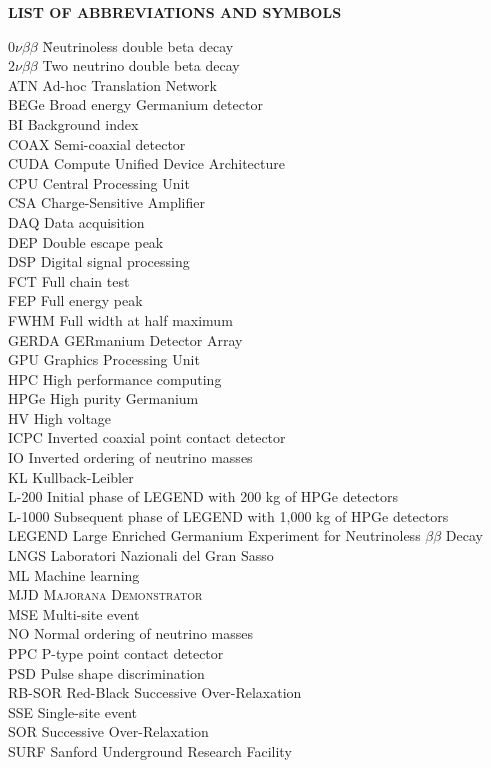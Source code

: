 {}

\begin{center}
{\normalfont \textbf{LIST OF ABBREVIATIONS AND SYMBOLS}}
\end{center}

\newcommand{\Ab}[2]{\noindent  #1 \> #2 \\}
\newcommand{\Abi}[2]{\noindent #1 \hspace{1.5cm} \= #2 \\}

\begin{tabbing}
\Abi{$0\nu\beta\beta$}{Neutrinoless double beta decay}
\Ab{$2\nu\beta\beta$}{Two neutrino double beta decay}
\Ab{ATN}{Ad-hoc Translation Network}
\Ab{BEGe}{Broad energy Germanium detector}
\Ab{BI}{Background index}
\Ab{COAX}{Semi-coaxial detector}
\Ab{CUDA} {Compute Unified Device Architecture}
\Ab{CPU}{Central Processing Unit}
\Ab{CSA} {Charge-Sensitive Amplifier}
\Ab{DAQ}{Data acquisition}
\Ab{DEP}{Double escape peak}
\Ab{DSP}{Digital signal processing}
\Ab{FCT}{Full chain test}
\Ab{FEP}{Full energy peak}
\Ab{FWHM}{Full width at half maximum}
\Ab{GERDA}{GERmanium Detector Array}
\Ab{GPU}{Graphics Processing Unit}
\Ab{HPC}{High performance computing}
\Ab{HPGe}{High purity Germanium}
\Ab{HV}{High voltage}
\Ab{ICPC}{Inverted coaxial point contact detector}
\Ab{IO}{Inverted ordering of neutrino masses}
\Ab{KL}{Kullback-Leibler}
\Ab{L-200}{Initial phase of LEGEND with 200 kg of HPGe detectors}
\Ab{L-1000}{Subsequent phase of LEGEND with 1,000 kg of HPGe detectors}
\Ab{LEGEND}{Large Enriched Germanium Experiment for Neutrinoless $\beta\beta$ Decay}
\Ab{LNGS}{Laboratori Nazionali del Gran Sasso}
\Ab{ML}{Machine learning}
\Ab{MJD}{\textsc{Majorana Demonstrator}}
\Ab{MSE}{Multi-site event}
\Ab{NO}{Normal ordering of neutrino masses}
\Ab{PPC}{P-type point contact detector}
\Ab{PSD}{Pulse shape discrimination}
\Ab{RB-SOR} {Red-Black Successive Over-Relaxation}
\Ab{SSE}{Single-site event}
\Ab{SOR} {Successive Over-Relaxation}

\Ab{SURF}{Sanford Underground Research Facility}
\end{tabbing}

\clearpage
